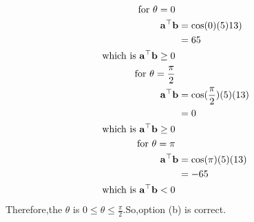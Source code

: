 \documentclass[10pt]{article}
\let\vec\mathbf{}
\begin{document}
\begin{enumerate}
\begin{align}
\text{ for $\theta=0$ }\notag \\
{\vec{a}}^{\top}{\vec{b}}&=\cos(0)(5)13)\\
&=65\\
\text{ which is ${\vec{a}}^{\top}{\vec{b}}\ge0$ }\notag \\
\text{ for $\theta=\frac{\pi}{2}$ }\notag \\
{\vec{a}}^{\top}{\vec{b}}&=\cos(\frac{\pi}{2})(5)(13) \\
&=0\\
\text{ which is ${\vec{a}}^{\top}{\vec{b}}\ge0$ }\notag \\
\text{ for $\theta=\pi$ }\notag \\
{\vec{a}}^{\top}{\vec{b}}&=\cos(\pi)(5)(13)\\
&=-65\\
\text{ which is ${\vec{a}}^{\top}{\vec{b}}<0$ }\notag
\end{align}
Therefore,the $\theta$ is 0$\le\theta\le\frac{\pi}{2}$.So,option (b) is correct.
\end{enumerate}
\end{document}
